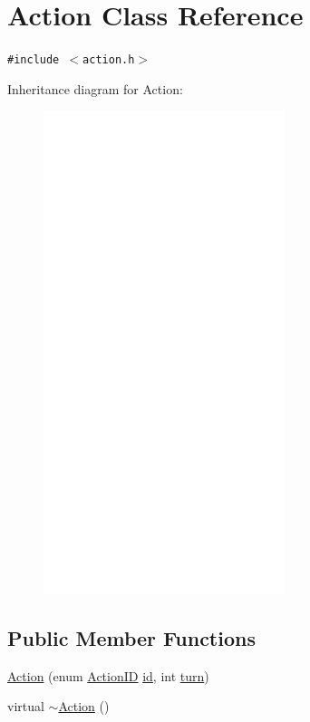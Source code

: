 \hypertarget{classAction}{
\section{Action Class Reference}
\label{classAction}
}
{\tt \#include $<$action.h$>$}

Inheritance diagram for Action:\nopagebreak
\begin{figure}[H]
\begin{center}
\leavevmode
\includegraphics[height=400pt]{classAction__inherit__graph}
\end{center}
\end{figure}
\subsection*{Public Member Functions}
\begin{CompactItemize}
\item 
\hyperlink{classAction_357539603b99a849c72646d1f7eb85e4}{Action} (enum \hyperlink{action_8h_3664bc98cf666c3d88d23f3fd5d9251c}{ActionID} \hyperlink{classAction_65ceb856e427411fa4eb8001880d41a8}{id}, int \hyperlink{classAction_51e5d56a6aa4a037e90df19587a225c7}{turn})
\item 
virtual \hyperlink{classAction_bcf4c6358f53a666631ace11b325a7cd}{$\sim$Action} ()
\end{CompactItemize}
